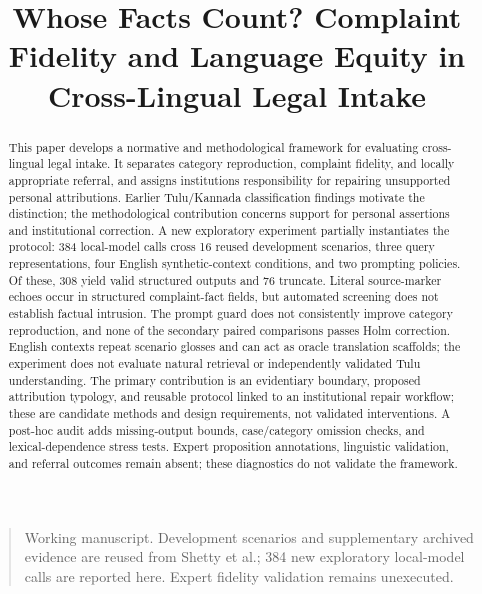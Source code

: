\documentclass[manuscript,screen,review,anonymous]{acmart}
\title{Whose Facts Count? Complaint Fidelity and Language Equity in Cross-Lingual Legal Intake}
\begin{document}
\begin{abstract}
This paper develops a normative and methodological framework for evaluating cross-lingual legal intake. It separates category reproduction, complaint fidelity, and locally appropriate referral, and assigns institutions responsibility for repairing unsupported personal attributions. Earlier Tulu/Kannada classification findings motivate the distinction; the methodological contribution concerns support for personal assertions and institutional correction. A new exploratory experiment partially instantiates the protocol: 384 local-model calls cross 16 reused development scenarios, three query representations, four English synthetic-context conditions, and two prompting policies. Of these, 308 yield valid structured outputs and 76 truncate. Literal source-marker echoes occur in structured complaint-fact fields, but automated screening does not establish factual intrusion. The prompt guard does not consistently improve category reproduction, and none of the secondary paired comparisons passes Holm correction. English contexts repeat scenario glosses and can act as oracle translation scaffolds; the experiment does not evaluate natural retrieval or independently validated Tulu understanding. The primary contribution is an evidentiary boundary, proposed attribution typology, and reusable protocol linked to an institutional repair workflow; these are candidate methods and design requirements, not validated interventions. A post-hoc audit adds missing-output bounds, case/category omission checks, and lexical-dependence stress tests. Expert proposition annotations, linguistic validation, and referral outcomes remain absent; these diagnostics do not validate the framework.
\end{abstract}
\maketitle
\begin{quote}\small Working manuscript. Development scenarios and supplementary archived evidence are reused from Shetty et al.; 384 new exploratory local-model calls are reported here. Expert fidelity validation remains unexecuted.\end{quote}
\end{document}
